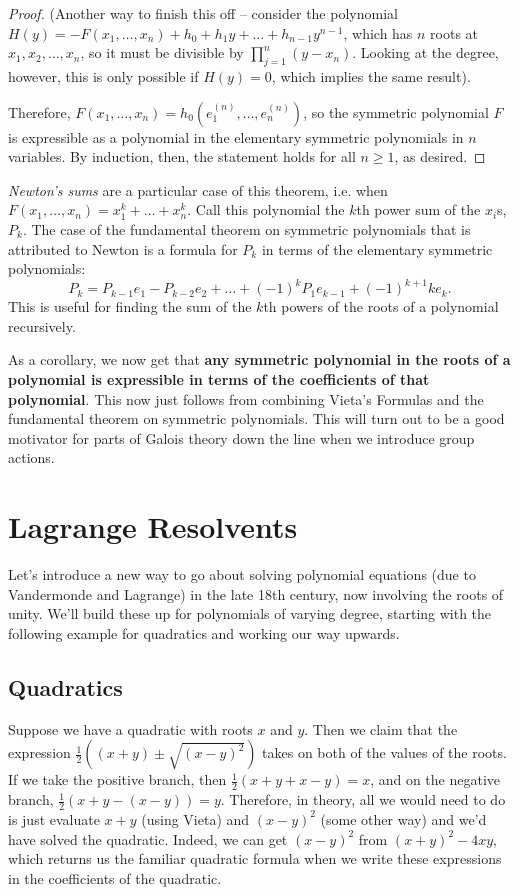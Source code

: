 \documentclass[12pt]{scrartcl}
\begin{document}
\begin{proof}
	(Another way to finish this off -- consider the polynomial $H(y) = -F(x_1, \dots, x_n) + h_0 + h_1 y + \dots + h_{n-1} y^{n-1}$, which has $n$ roots at $x_1, x_2, \dots, x_n$, so it must be divisible by $\prod_{j=1}^n (y - x_n)$. Looking at the degree, however, this is only possible if $H(y) = 0$, which implies the same result).

	Therefore, $F(x_1, \dots, x_n) = h_0(e_1^{(n)}, \dots, e_n^{(n)})$, so the symmetric polynomial $F$ is expressible as a polynomial in the elementary symmetric polynomials in $n$ variables. By induction, then, the statement holds for all $n \geq 1$, as desired.
\end{proof}

\begin{remark}
	\textit{Newton's sums} are a particular case of this theorem, i.e. when $F(x_1, \dots, x_n) = x_1^k + \dots + x_n^k$. Call this polynomial the $k$th power sum of the $x_i$s, $P_k$. The case of the fundamental theorem on symmetric polynomials that is attributed to Newton is a formula for $P_k$ in terms of the elementary symmetric polynomials:
	\[
		P_k = P_{k-1} e_1 - P_{k-2} e_2 + \dots + (-1)^{k} P_1 e_{k-1} + (-1)^{k+1} k e_k
		.\]
	This is useful for finding the sum of the $k$th powers of the roots of a polynomial recursively.
\end{remark}

As a corollary, we now get that \textbf{any symmetric polynomial in the roots of a polynomial is expressible in terms of the coefficients of that polynomial}. This now just follows from combining Vieta's Formulas and the fundamental theorem on symmetric polynomials. This will turn out to be a good motivator for parts of Galois theory down the line when we introduce group actions.

\section{Lagrange Resolvents}
Let's introduce a new way to go about solving polynomial equations (due to Vandermonde and Lagrange) in the late 18th century, now involving the roots of unity. We'll build these up for polynomials of varying degree, starting with the following example for quadratics and working our way upwards. 

\subsection{Quadratics}
Suppose we have a quadratic with roots $x$ and $y$. Then we claim that the expression $\frac 12 ( (x + y) \pm  \sqrt{ (x-y)^2 })$ takes on both of the values of the roots. If we take the positive branch, then $\frac 12( x + y + x - y ) = x$, and on the negative branch, $\frac 12( x + y - (x - y)) = y$. Therefore, in theory, all we would need to do is just evaluate $x + y$ (using Vieta) and $(x - y)^2$ (some other way) and we'd have solved the quadratic. Indeed, we can get $(x-y)^2$ from $(x+y)^2 - 4xy$, which returns us the familiar quadratic formula when we write these expressions in the coefficients of the quadratic. 
\end{document}
